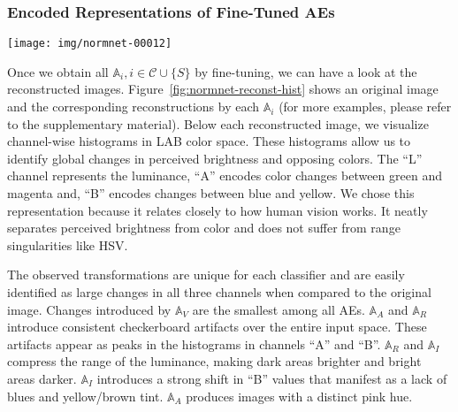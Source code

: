\documentclass[10pt,twocolumn,a4paper]{article}
\newcommand{\autoe}[1]{\mathbb{A}_{#1}}
\begin{document}
\subsubsection{Encoded Representations of Fine-Tuned AEs}\label{sec:normnet-training-finetune}\begin{figure*}
	\texttt{[image: img/normnet-00012]}
	\caption{Example taken from ImageNet's validation set. Each image corresponds to a reconstruction produced by one of the fine-tuned AEs. Below each reconstruction, global histograms of the image in LAB space are shown. Zoomed portions of the image reconstructions are provided, showing the emergent patterns in more detail.}
	\label{fig:normnet-reconst-hist}
	\vspace{-0.2em}
\end{figure*}
Once we obtain all $\autoe{i}, i\in \mathcal{C} \cup \{S\}$ by fine-tuning, we can have a look at the reconstructed images.
Figure~\ref{fig:normnet-reconst-hist} shows an original image and the corresponding reconstructions by each $\autoe{i}$
(for more examples, please refer to the supplementary material).
Below each reconstructed image, we visualize channel-wise histograms in LAB color space.
These histograms allow us to identify global changes in perceived brightness and opposing colors.
The ``L'' channel represents the luminance, ``A'' encodes color changes between green and magenta and, ``B'' encodes changes between blue and yellow.
We chose this representation because it relates closely to how human vision works.
It neatly separates perceived brightness from color and does not suffer from range singularities like HSV.

The observed transformations are unique for each classifier and are easily identified as large changes in all three channels when compared to the original image.
Changes introduced by $\autoe{V}$ are the smallest among all AEs.
$\autoe{A}$ and $\autoe{R}$ introduce consistent checkerboard artifacts over the entire input space.
These artifacts appear as peaks in the histograms in channels ``A'' and ``B''.
$\autoe{R}$ and $\autoe{I}$ compress the range of the luminance, making dark areas brighter and bright areas darker.
$\autoe{I}$ introduces a strong shift in ``B'' values that manifest as a lack of blues and yellow/brown tint.
$\autoe{A}$ produces images with a distinct pink hue.
\end{document}
